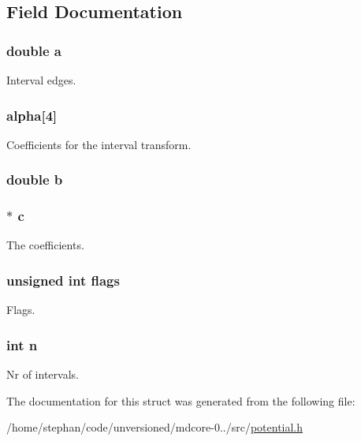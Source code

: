 \subsection{Field Documentation}
\hypertarget{structpotential_a1031d0e0a97a340abfe0a6ab9e831045}{
\subsubsection[{a}]{\setlength{\rightskip}{0pt plus 5cm}double a}}\label{structpotential_a1031d0e0a97a340abfe0a6ab9e831045}
Interval edges. \hypertarget{structpotential_a90cc93057627c97aeea54021b8758532}{
\subsubsection[{alpha}]{ alpha\mbox{[}4\mbox{]}}}\label{structpotential_a90cc93057627c97aeea54021b8758532}
Coefficients for the interval transform. \hypertarget{structpotential_a1510a66dacf9cf3586de5fc89ae2a073}{
\subsubsection[{b}]{\setlength{\rightskip}{0pt plus 5cm}double b}}\label{structpotential_a1510a66dacf9cf3586de5fc89ae2a073}
\hypertarget{structpotential_a30fc290af674fbe78d5ea515353d4ec2}{
\subsubsection[{c}]{$\ast$ c}}\label{structpotential_a30fc290af674fbe78d5ea515353d4ec2}
The coefficients. \hypertarget{structpotential_ac92588540e8c1d014a08cd8a45462b19}{
\subsubsection[{flags}]{\setlength{\rightskip}{0pt plus 5cm}unsigned int flags}}\label{structpotential_ac92588540e8c1d014a08cd8a45462b19}
Flags. \hypertarget{structpotential_a76f11d9a0a47b94f72c2d0e77fb32240}{
\subsubsection[{n}]{\setlength{\rightskip}{0pt plus 5cm}int n}}\label{structpotential_a76f11d9a0a47b94f72c2d0e77fb32240}
Nr of intervals. 

The documentation for this struct was generated from the following file\-:\begin{DoxyCompactItemize}
\item 
/home/stephan/code/unversioned/mdcore-\/0../src/\hyperlink{potential_8h}{potential.\-h}\end{DoxyCompactItemize}
